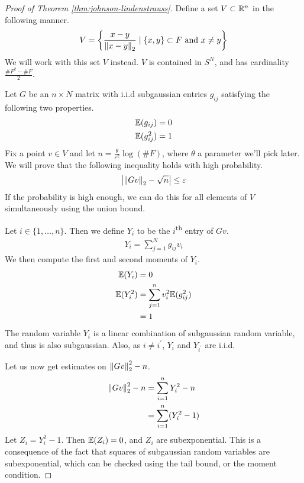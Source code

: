 \documentclass[11pt]{article}
\begin{document}
\begin{proof}[Proof of Theorem \ref{thm:johnson-lindenstrauss}]
  Define a set $V \subset \mathbb{R}^n$ in the following manner.
  \begin{align*}
    V = \left\{ \frac{x-y}{\left\lVert x-y\right\rVert_2} \mid \{x, y\} \subset F\text{ and }x \neq y \right\}
  \end{align*}
  We will work with this set $V$ instead.
  $V$ is contained in $S^N$, and has cardinality $\frac{\#F^2 - \#F}{2}$.

  Let $G$ be an $n \times N$ matrix with i.i.d subgaussian entries $g_{ij}$ satisfying the following two properties.
  \begin{align*}
    \mathbb{E}(g_{ij}) &= 0 \\
    \mathbb{E}(g_{ij}^2) &= 1
  \end{align*}
  Fix a point $v \in V$ and let $n = \frac{\theta}{\varepsilon^2} \log(\#F)$, where $\theta$ a parameter we'll pick later.
  We will prove that the following inequality holds with high probability.
  \begin{align*}
    \left| \left\lVert Gv\right\rVert_2 - \sqrt{n} \right| \leq \varepsilon
  \end{align*}
  If the probability is high enough, we can do this for all elements of $V$ simultaneously using the union bound.

  Let $i \in \{1, \ldots, n\}$. Then we define $Y_i$ to be the $i$\textsuperscript{th} entry of $Gv$.
  \begin{align*}
    Y_i = \sum_{j=1}^N g_{ij}v_i
  \end{align*}
  We then compute the first and second moments of $Y_i$.
  \begin{align*}
    \mathbb{E}(Y_i) &= 0 \\
    \mathbb{E}(Y_i^2) &= \sum_{j=1}^{n} v_i^2 \mathbb{E}(g_{ij}^2) \\
            &= 1
  \end{align*}
  The random variable $Y_i$ is a linear combination of subgaussian random variable, and thus is also subgaussian. Also, as $i \neq i^{\prime}$, $Y_i$ and $Y_{i^{\prime}}$ are i.i.d.

  Let us now get estimates on $\left\lVert Gv\right\rVert_2^2 - n$.
  \begin{align*}
    \left\lVert Gv\right\rVert_2^2 - n &= \sum_{i=1}^n Y_i^2 - n \\
                      &= \sum_{i=1}^n (Y_i^2 - 1)
  \end{align*}
  Let $Z_i = Y_i^2 - 1$. Then $\mathbb{E}(Z_i) = 0$, and $Z_i$ are subexponential. This is a consequence of the fact that squares of subgaussian random variables are subexponential, which can be checked using the tail bound, or the moment condition.


\end{proof}
\end{document}
